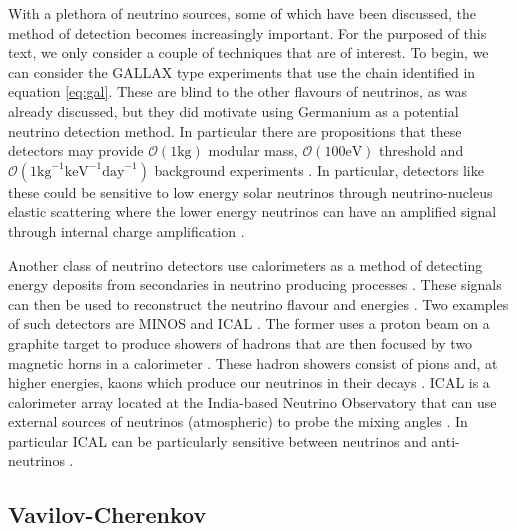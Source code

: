With a plethora of neutrino sources, some of which have been discussed, the method of detection becomes increasingly important. For the purposed of this text, we only consider a couple of techniques that are of interest. To begin, we can consider the GALLAX type experiments that use the chain identified in equation \ref{eq:gal}. These are blind to the other flavours of neutrinos, as was already discussed, but they did motivate using Germanium as a potential neutrino detection method. In particular there are propositions that these detectors may provide $\mathcal{O}(1 \text{kg})$ modular mass, $\mathcal{O}(100 \text{eV})$ threshold and $\mathcal{O}(1 \text{kg}^{-1}\text{keV}^{-1}\text{day}^{-1})$ background experiments \cite{som_germ}. In particular, detectors like these could be sensitive to low energy solar neutrinos through neutrino-nucleus elastic scattering \cite{germ_low} where the lower energy neutrinos can have an amplified signal through internal charge amplification \cite{germ_low}.

Another class of neutrino detectors use calorimeters as a method of detecting energy deposits from secondaries in neutrino producing processes \cite{minos,ical}. These signals can then be used to reconstruct the neutrino flavour and energies \cite{minos,ical}. Two examples of such detectors are MINOS \cite{minos} and ICAL \cite{ical}. The former uses a proton beam on a graphite target to produce showers of hadrons that are then focused by two magnetic horns in a calorimeter \cite{minos}. These hadron showers consist of pions and, at higher energies, kaons which produce our neutrinos in their decays \cite{minos}. ICAL is a calorimeter array located at the India-based Neutrino Observatory \cite{ical} that can use external sources of neutrinos (atmospheric) to probe the mixing angles \cite{ical}. In particular ICAL can be particularly sensitive between neutrinos and anti-neutrinos \cite{ical}.

\subsection{Vavilov-Cherenkov}

